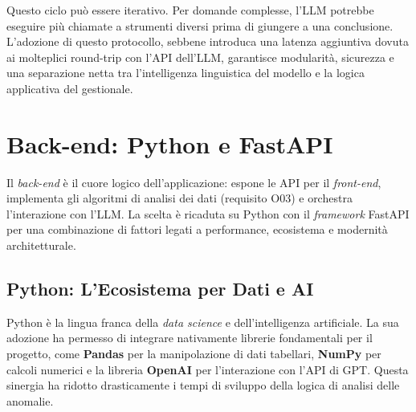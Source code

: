 Questo ciclo può essere iterativo. Per domande complesse, l'LLM potrebbe eseguire più chiamate a strumenti diversi prima di giungere a una conclusione. L'adozione di questo protocollo, sebbene introduca una latenza aggiuntiva dovuta ai molteplici round-trip con l'API dell'LLM, garantisce modularità, sicurezza e una separazione netta tra l'intelligenza linguistica del modello e la logica applicativa del gestionale.

\section{Back-end: Python e FastAPI}
\label{sec:backend}
Il \textit{back-end} è il cuore logico dell'applicazione: espone le API per il \textit{front-end}, implementa gli algoritmi di analisi dei dati (requisito O03) e orchestra l'interazione con l'LLM. La scelta è ricaduta su Python con il \textit{framework} FastAPI per una combinazione di fattori legati a performance, ecosistema e modernità architetturale.

\subsection{Python: L'Ecosistema per Dati e AI}
Python è la lingua franca della \textit{data science} e dell'intelligenza artificiale. La sua adozione ha permesso di integrare nativamente librerie fondamentali per il progetto, come \textbf{Pandas} per la manipolazione di dati tabellari, \textbf{NumPy} per calcoli numerici e la libreria \textbf{OpenAI} per l'interazione con l'API di GPT. Questa sinergia ha ridotto drasticamente i tempi di sviluppo della logica di analisi delle anomalie.

